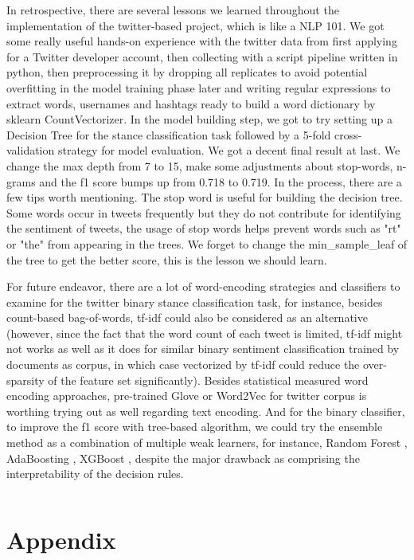\documentclass{article} %
\begin{document}
In retrospective, there are several lessons we learned throughout the implementation of the twitter-based project, which is like a NLP 101. We got some really useful hands-on experience with the twitter data from first applying for a Twitter developer account, then collecting with a script pipeline written in python, then preprocessing it by dropping all replicates to avoid potential overfitting in the model training phase later and writing regular expressions to extract words, usernames and hashtags ready to build a word dictionary by sklearn CountVectorizer. In the model building step, we got to try setting up a Decision Tree for the stance classification task followed by  a 5-fold cross-validation strategy for model evaluation. We got a decent final result at last.  We change the max depth from 7 to 15, make some adjustments about stop-words, n-grams and the f1 score bumps up from 0.718 to 0.719. In the process, there are a few tips worth mentioning. The stop word is useful for building the decision tree. Some words occur in tweets frequently but they do not contribute for identifying the sentiment of tweets, the usage of stop words helps prevent words such as "rt" or "the" from appearing in the trees. We forget to change the min\_sample\_leaf of the tree to get the better score, this is the lesson we should learn.
 
For future endeavor, there are a lot of word-encoding strategies and classifiers to examine for the twitter binary stance classification task, for instance, besides count-based bag-of-words, tf-idf \cite{scikit-learn} could also be considered as an alternative (however, since the fact that the word count of each tweet is limited, tf-idf might not works as well as it does for similar binary sentiment classification trained by documents as corpus, in which case vectorized by tf-idf could reduce the over-sparsity of the feature set significantly). Besides statistical measured word encoding approaches, pre-trained Glove \cite{glove} or Word2Vec \cite{w2v} for twitter corpus is worthing trying out as well regarding text encoding. And for the binary classifier, to improve the f1 score with tree-based algorithm, we could try the ensemble method as a combination of multiple weak learners, for instance, Random Forest \cite{scikit-learn}, AdaBoosting \cite{scikit-learn}, XGBoost \cite{xg}, despite the major drawback as comprising the interpretability of the decision rules.

\[\]


\section{Appendix}
\appendix
\end{document}
